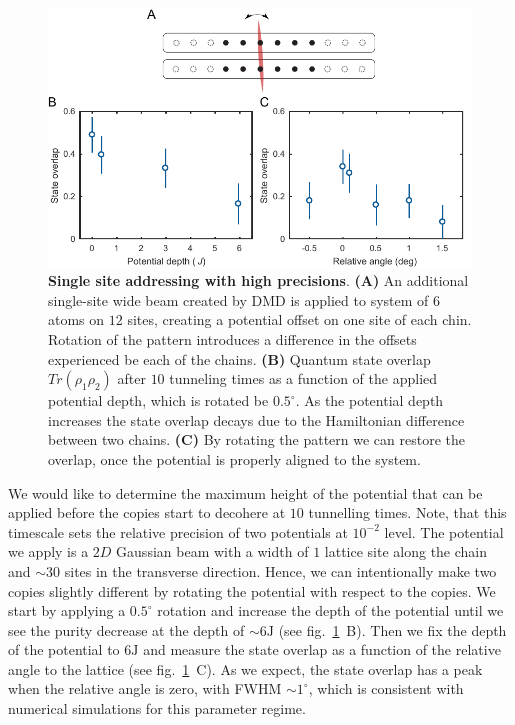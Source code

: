 \begin{figure}[t]
	\centering
	\includegraphics[scale=1]{figures/CBH_pattern_rotation_v2.pdf}
	\caption{{\bf Single site addressing with high precisions}. {\bf (A)} An additional single-site wide beam created by DMD is applied to system of $6$ atoms on $12$ sites, creating a potential offset on one site of each chin. Rotation of the pattern introduces a difference in the offsets experienced be each of the chains. {\bf (B)} Quantum state overlap $Tr(\rho_1 \rho_2)$ after $10$ tunneling times as a function of the applied potential depth, which is rotated be $0.5^{\circ}$. As the potential depth increases the state overlap decays due to the Hamiltonian difference between two chains. {\bf (C)} By rotating the pattern we can restore the overlap, once the potential is properly aligned to the system.}
	\label{fig:CBH_pattern_rotation}
\end{figure}

We would like to determine the maximum height of the potential that can be applied before the copies start to decohere at $10$ tunnelling times. Note, that this timescale sets the relative precision of two potentials at $10^{-2}$ level. The potential we apply is a $2D$ Gaussian beam with a width of $1$ lattice site along the chain and $\sim 30$ sites in the transverse direction. Hence, we can intentionally make two copies slightly different by rotating the potential with respect to the copies. We start by applying a $0.5^{\circ}$ rotation and increase the depth of the potential until we see the purity decrease at the depth of $\sim 6\mathrm{J}$ (see fig.~\ref{fig:CBH_pattern_rotation}~B). Then we fix the depth of the potential to $6\mathrm{J}$ and measure the state overlap as a function of the relative angle to the lattice (see fig.~\ref{fig:CBH_pattern_rotation}~C). As we expect, the state overlap has a peak when the relative angle is zero, with FWHM $\sim 1^{\circ}$, which is consistent with numerical simulations for this parameter regime.

